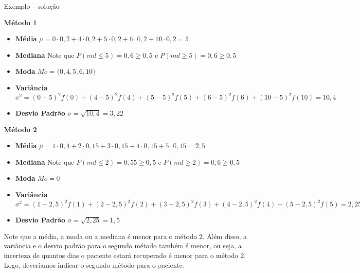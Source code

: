 \documentclass[9pt]{beamer}
\begin{document}
\begin{frame}{Exemplo -- solução}

{\scriptsize
 \textbf{Método 1}
 \begin{itemize}
  \item \textbf{Média} $\mu = 0\cdot 0,2 + 4\cdot 0,2 + 5 \cdot 0,2 + 6 \cdot 0,2 + 10 \cdot 0,2=5$

  \item \textbf{Mediana} Note que $P(md \leq 5)=0,6 \geq 0,5$ e $P(md \geq 5) = 0,6 \geq 0,5$
  
  \item \textbf{Moda} $Mo = \{0,4,5,6,10\}$
  \item \textbf{Variância} $\sigma^2 = (0-5)^2f(0) + (4-5)^2f(4)+(5-5)^2f(5)+(6-5)^2f(6)+(10-5)^2f(10)=10,4$
  \item \textbf{Desvio Padrão} $\sigma = \sqrt{10,4}=3,22$
 \end{itemize}
 \vfill
 
  \textbf{Método 2}
 \begin{itemize}
  \item \textbf{Média} $\mu = 1\cdot 0,4 + 2\cdot 0,15 + 3 \cdot 0,15 + 4 \cdot 0,15 + 5 \cdot 0,15=2,5$

  \item \textbf{Mediana} Note que $P(md \leq 2)=0,55 \geq 0,5$ e $P(md \geq 2) = 0,6 \geq 0,5$
  
  \item \textbf{Moda} $Mo = 0$
  \item \textbf{Variância} $\sigma^2 = (1-2,5)^2f(1) + (2-2,5)^2f(2)+(3-2,5)^2f(3)+(4-2,5)^2f(4)+(5-2,5)^2f(5)=2,25$
  \item \textbf{Desvio Padrão} $\sigma = \sqrt{2,25}=1,5$
 \end{itemize}  
}

Note que a média, a moda ou a mediana é menor para o método 2. Além disso, a variância e o desvio padrão para o segundo método também é menor, ou seja, a incerteza de quantos dias  o paciente estará recuperado é menor para o método 2. Logo, deveríamos indicar o segundo método para o paciente.
\end{frame}
% 
% 
\end{document}
